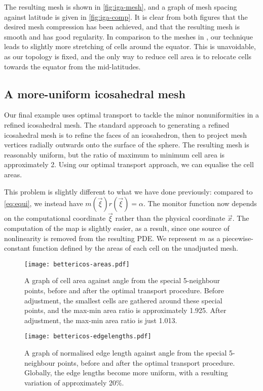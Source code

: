 \documentclass[11pt, a4paper]{scrartcl}  %
\theoremstyle{plain}
\theoremstyle{definition}
\numberwithin{equation}{section}
\begin{document}
The resulting mesh is shown in \cref{fig:iga-mesh}, and a graph of
mesh spacing against latitude is given in \cref{fig:iga-comp}. It is
clear from both figures that the desired mesh compression has been
achieved, and that the resulting mesh is smooth and has good regularity.
In comparison to the meshes in
\citet{iga2017equatorially}, our technique leads to slightly more
stretching of cells around the equator. This is unavoidable, as our
topology is fixed, and the only way to reduce cell area is to relocate
cells towards the equator from the mid-latitudes.

\subsection{A more-uniform icosahedral mesh}

Our final example uses optimal transport to tackle the minor
nonuniformities in a refined icosahedral mesh. The standard approach to
generating a refined icosahedral mesh is to refine the faces of an
icosahedron, then to project mesh vertices radially outwards onto the
surface of the sphere. The resulting mesh is reasonably uniform, but the
ratio of maximum to minimum cell area is approximately 2. Using our
optimal transport approach, we can equalise the cell areas.

This problem is slightly different to what we have done previously:
compared to \cref{eq:equi}, we instead have $m(\vec{\xi}) r(\vec{\xi}) = \alpha$.
The monitor function now depends on the computational coordinate
$\vec{\xi}$ rather than the physical coordinate $\vec{x}$. The
computation of the map is slightly easier, as a result, since one source
of nonlinearity is removed from the resulting PDE. We represent $m$ as a
piecewise-constant function defined by the areas of each cell on the
unadjusted mesh.

\begin{figure}
  \centering
  \texttt{[image: bettericos-areas.pdf]}
  \caption{A graph of cell area against angle from the special
5-neighbour points, before and after the optimal transport procedure.
Before adjustment, the smallest cells are gathered around these special
points, and the max-min area ratio is approximately 1.925. After
adjustment, the max-min area ratio is just 1.013.}
\label{fig:icos-areas}
\end{figure}

\begin{figure}
  \centering
  \texttt{[image: bettericos-edgelengths.pdf]}
  \caption{A graph of normalised edge length against angle from the
special 5-neighbour points, before and after the optimal transport
procedure. Globally, the edge lengths become more uniform, with a
resulting variation of approximately 20\%.}
\label{fig:icos-edgelengths}
\end{figure}
\end{document}
